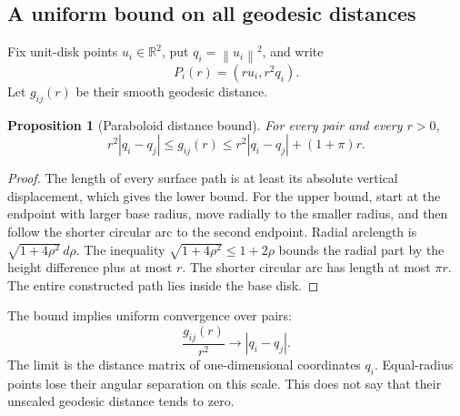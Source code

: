 \documentclass[11pt]{article}
\newtheorem{proposition}{Proposition}[section]
\theoremstyle{remark}\newtheorem{remark}[proposition]{Remark}
\newcommand{\R}{\mathbb R}
\newcommand{\norm}[1]{\left\lVert#1\right\rVert}
\begin{document}
\subsection{A uniform bound on all geodesic distances}
Fix unit-disk points $u_i\in\R^2$, put $q_i=\norm{u_i}^2$, and write
\begin{equation}
 P_i(r)=(ru_i,r^2q_i).
\end{equation}
Let $g_{ij}(r)$ be their smooth geodesic distance.

\begin{proposition}[Paraboloid distance bound]\label{prop:parab-bound}
For every pair and every $r>0$,
\begin{equation}\label{eq:parab-bound}
 r^2|q_i-q_j|\le g_{ij}(r)
 \le r^2|q_i-q_j|+(1+\pi)r.
\end{equation}
\end{proposition}
\begin{proof}
The length of every surface path is at least its absolute vertical displacement,
which gives the lower bound. For the upper bound, start at the endpoint with
larger base radius, move radially to the smaller radius, and then follow the
shorter circular arc to the second endpoint. Radial arclength is
$\sqrt{1+4\rho^2}\,d\rho$. The inequality
$\sqrt{1+4\rho^2}\le1+2\rho$ bounds the radial part by the height difference
plus at most $r$. The shorter circular arc has length at most $\pi r$.
The entire constructed path lies inside the base disk.
\end{proof}

The bound implies uniform convergence over pairs:
\begin{equation}\label{eq:parab-limit}
 \frac{g_{ij}(r)}{r^2}\longrightarrow |q_i-q_j|.
\end{equation}
The limit is the distance matrix of one-dimensional coordinates $q_i$.
Equal-radius points lose their angular separation on this scale. This does
not say that their unscaled geodesic distance tends to zero.
\end{document}
